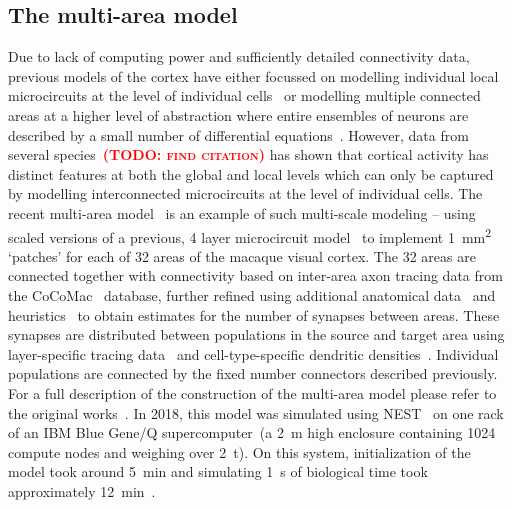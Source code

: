 \documentclass[9pt,twocolumn,twoside,lineno]{pnas-new}
\newcommand{\todo}[1]{\textbf{\textsc{\textcolor{red}{(TODO: #1)}}}}
\begin{document}
\subsection*{The multi-area model}
Due to lack of computing power and sufficiently detailed connectivity data, previous models of the cortex have either focussed on modelling individual local microcircuits at the level of individual cells~\citep{Izhikevich2008,Potjans2012} or modelling multiple connected areas at a higher level of abstraction where entire ensembles of neurons are described by a small number of differential equations~\citep{Cabral2014}.
However, data from several species~\todo{find citation} has shown that cortical activity has distinct features at both the global and local levels which can only be captured by modelling interconnected microcircuits at the level of individual cells.
The recent multi-area model~\citep{Schmidt2018a,Schmidt2018} is an example of such multi-scale modeling -- using scaled versions of a previous, 4 layer microcircuit model~\citep{Potjans2012} to implement \SI{1}{\milli\meter\squared} `patches' for each of 32 areas of the macaque visual cortex.
The 32 areas are connected together with connectivity based on inter-area axon tracing data from the CoCoMac~\citep{Bakker2012} database, further refined using additional anatomical data~\citep{Markov2014} and heuristics~\citep{Ercsey-Ravasz2013} to obtain estimates for the number of synapses between areas.
These synapses are distributed between populations in the source and target area using layer-specific tracing data~\citep{Markov2014b} and cell-type-specific dendritic densities~\citep{Binzegger2004}.
Individual populations are connected by the fixed number connectors described previously.
For a full description of the construction of the multi-area model please refer to the original works~\citep{Schmidt2018a,Schmidt2018}.
In 2018, this model was simulated using NEST~\citep{Gewaltig2007} on one rack of an IBM Blue Gene/Q supercomputer~(a \SI{2}{\metre} high enclosure containing \num{1024} compute nodes and weighing over \SI{2}{\tonne}).
On this system, initialization of the model took around \SI{5}{\minute} and simulating \SI{1}{\second} of biological time took approximately \SI{12}{\minute}~\citep{Schmidt2018}.
\end{document}
